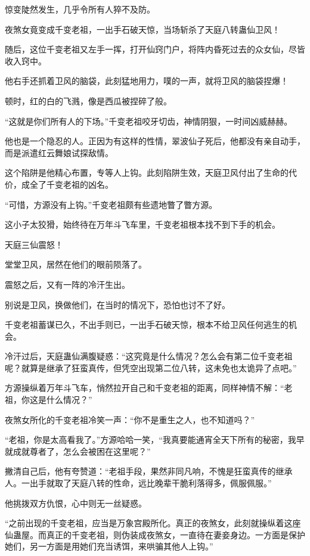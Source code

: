 
\begin{this_body}

惊变陡然发生，几乎令所有人猝不及防。

夜煞女竟变成千变老祖，一出手石破天惊，当场斩杀了天庭八转蛊仙卫风！

随后，这位千变老祖又左手一挥，打开仙窍门户，将阵内昏死过去的众女仙，尽皆收入窍中。

他右手还抓着卫风的脑袋，此刻猛地用力，噗的一声，就将卫风的脑袋捏爆！

顿时，红的白的飞溅，像是西瓜被捏碎了般。

“这就是你们所有人的下场。”千变老祖咬牙切齿，神情阴狠，一时间凶威赫赫。

他也是一个隐忍的人。正因为有这样的性情，翠波仙子死后，他都没有亲自动手，而是派遣红云舞娘试探敌情。

这个陷阱是他精心布置，专等人上钩。此刻陷阱生效，天庭卫风付出了生命的代价，成全了千变老祖的凶名。

“可惜，方源没有上钩。”千变老祖颇有些遗地瞥了瞥方源。

这小子太狡猾，始终待在万年斗飞车里，千变老祖根本找不到下手的机会。

天庭三仙震怒！

堂堂卫风，居然在他们的眼前陨落了。

震怒之后，又有一阵的冷汗生出。

别说是卫风，换做他们，在当时的情况下，恐怕也讨不了好。

千变老祖蓄谋已久，不出手则已，一出手石破天惊，根本不给卫风任何逃生的机会。

冷汗过后，天庭蛊仙满腹疑惑：“这究竟是什么情况？怎么会有第二位千变老祖呢？就算是继承了狂蛮真传，但凭空出现第二位八转，这未免也太诡异了点吧。”

方源操纵着万年斗飞车，悄然拉开自己和千变老祖的距离，同样神情不解：“老祖，你这是什么情况？”

夜煞女所化的千变老祖冷笑一声：“你不是重生之人，也不知道吗？”

“老祖，你是太高看我了。”方源哈哈一笑，“我真要能通宵全天下所有的秘密，我早就成就尊者了，怎么会被困在这里呢？”

撇清自己后，他有夸赞道：“老祖手段，果然非同凡响，不愧是狂蛮真传的继承人。一出手就取了天庭八转的性命，远比晚辈干脆利落得多，佩服佩服。”

他挑拨双方仇恨，心中则无一丝疑惑。

“之前出现的千变老祖，应当是万象宫殿所化。真正的夜煞女，此刻就操纵着这座仙蛊屋。而真正的千变老祖，则伪装成夜煞女，一直待在妻妾身边。一方面是保护她们，另一方面是用她们充当诱饵，来哄骗其他人上钩。”


\end{this_body}
